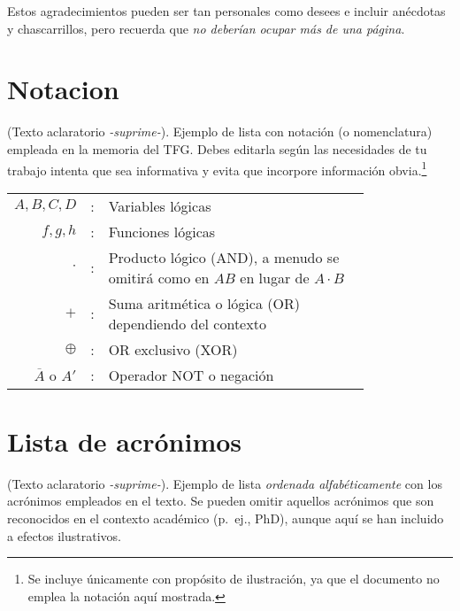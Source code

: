 Estos agradecimientos pueden ser tan personales como desees e incluir anécdotas y chascarrillos, pero recuerda que \emph{no deberían ocupar más de una página}.

\firma %

\section*{Notacion}
(Texto aclaratorio \emph{-suprime-}). Ejemplo de lista con notación (o nomenclatura) empleada en la memoria del TFG. Debes editarla según las necesidades de tu trabajo intenta que sea informativa y evita que incorpore información obvia.\footnote{Se incluye únicamente con propósito de ilustración, ya que el documento no emplea la notación aquí mostrada.}

\begin{tabular}{r r p{0.8\linewidth}}
$A, B, C, D$	& : & Variables lógicas \\
$f, g, h$		& :	& Funciones lógicas \\
$\cdot$			& : & Producto lógico (AND), a menudo se omitirá como en $A 
B$ en lugar de $A \cdot B$\\
$+$				& : & Suma aritmética o lógica (OR) dependiendo del 
contexto\\
$\oplus$		& : & OR exclusivo (XOR)\\
$\overline{A}$ o ${A}'$	& : & Operador NOT o negación
\end{tabular}

\section*{Lista de acrónimos}
(Texto aclaratorio \emph{-suprime-}). Ejemplo de lista \emph{ordenada alfabéticamente} con los acrónimos empleados en el texto. Se pueden omitir aquellos acrónimos que son reconocidos en el contexto académico (p.~ej., PhD), aunque aquí se han incluido a efectos ilustrativos.

